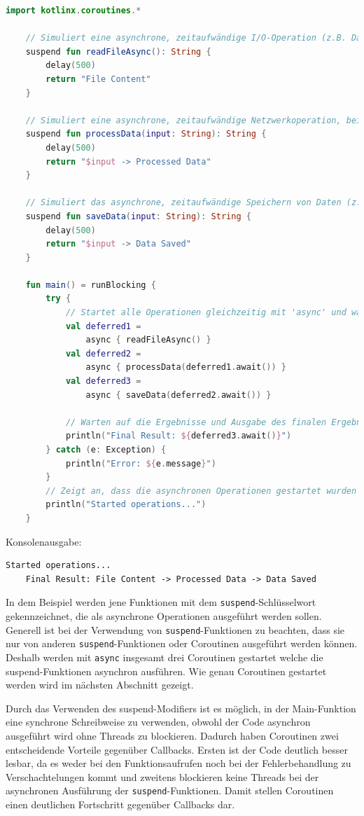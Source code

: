 \documentclass[fontsize=12pt,paper=a4,twoside=semi,parskip=half-,headsepline,headinclude]{scrreprt}
\begin{document}
\begin{lstlisting}[language=Kotlin]
	import kotlinx.coroutines.*

	// Simuliert eine asynchrone, zeitaufwändige I/O-Operation (z.B. Datei lesen)
	suspend fun readFileAsync(): String {
		delay(500)
		return "File Content"
	}

	// Simuliert eine asynchrone, zeitaufwändige Netzwerkoperation, bei der Daten verarbeitet werden (z.B. API-Anfrage)
	suspend fun processData(input: String): String {
		delay(500)
		return "$input -> Processed Data"
	}

	// Simuliert das asynchrone, zeitaufwändige Speichern von Daten (z.B. in einer Datenbank oder Datei)
	suspend fun saveData(input: String): String {
		delay(500)
		return "$input -> Data Saved"
	}

	fun main() = runBlocking {
		try {
			// Startet alle Operationen gleichzeitig mit 'async' und wartet auf deren Ergebnisse
			val deferred1 = 
				async { readFileAsync() }
			val deferred2 = 
				async { processData(deferred1.await()) }
			val deferred3 = 
				async { saveData(deferred2.await()) }
		
			// Warten auf die Ergebnisse und Ausgabe des finalen Ergebnisses
			println("Final Result: ${deferred3.await()}")
		} catch (e: Exception) {
			println("Error: ${e.message}")
		}
		// Zeigt an, dass die asynchronen Operationen gestartet wurden
		println("Started operations...")  
	}
\end{lstlisting}
Konsolenausgabe:
\begin{lstlisting}[frame=shadowbox, rulecolor=\color{black}, backgroundcolor=\color{gray!10}]
	Started operations...
	Final Result: File Content -> Processed Data -> Data Saved
\end{lstlisting}

In dem Beispiel werden jene Funktionen mit dem \texttt{suspend}-Schlüsselwort gekennzeichnet, die als asynchrone Operationen ausgeführt werden sollen. Generell ist bei der Verwendung von \texttt{suspend}-Funktionen zu beachten, dass sie nur von anderen \texttt{suspend}-Funktionen oder Coroutinen ausgeführt werden können. Deshalb werden mit \texttt{async} insgesamt drei Coroutinen gestartet welche die {suspend}-Funktionen asynchron ausführen. Wie genau Coroutinen gestartet werden wird im nächsten Abschnitt gezeigt.

Durch das Verwenden des suspend-Modifiers ist es möglich, in der Main-Funktion eine synchrone Schreibweise zu verwenden, obwohl der Code asynchron ausgeführt wird ohne Threads zu blockieren. Dadurch haben Coroutinen zwei entscheidende Vorteile gegenüber Callbacks. Ersten ist der Code deutlich besser lesbar, da es weder bei den Funktionsaufrufen noch bei der Fehlerbehandlung zu Verschachtelungen kommt und zweitens blockieren keine Threads bei der asynchronen Ausführung der \texttt{suspend}-Funktionen. Damit stellen Coroutinen einen deutlichen Fortschritt gegenüber Callbacks dar. 
\end{document}
